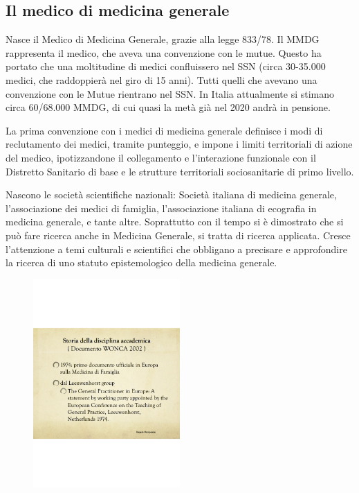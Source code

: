 \subsection{Il medico di medicina generale}

Nasce il Medico di Medicina Generale, grazie alla legge 833/78. Il MMDG
rappresenta il medico, che aveva una convenzione con le mutue. Questo ha
portato che una moltitudine di medici confluissero nel SSN (circa
30-35.000 medici, che raddoppierà nel giro di 15 anni). Tutti quelli che
avevano una convenzione con le Mutue rientrano nel SSN. In Italia
attualmente si stimano circa 60/68.000 MMDG, di cui quasi la metà già
nel 2020 andrà in pensione.

La prima convenzione con i medici di medicina generale definisce i modi
di reclutamento dei medici, tramite punteggio, e impone i limiti
territoriali di azione del medico, ipotizzandone il collegamento e
l'interazione funzionale con il Distretto Sanitario di base e le
strutture territoriali sociosanitarie di primo livello.

Nascono le società scientifiche nazionali: Società italiana di medicina
generale, l'associazione dei medici di famiglia, l'associazione italiana
di ecografia in medicina generale, e tante altre. Soprattutto con il
tempo si è dimostrato che si può fare ricerca anche in Medicina
Generale, si tratta di ricerca applicata. Cresce l'attenzione a temi
culturali e scientifici che obbligano a precisare e approfondire la
ricerca di uno statuto epistemologico della medicina generale.

\begin{figure}[!ht]
\centering
	\includegraphics[width=0.5\textwidth]{38/image6.png}
	\end{figure}
	
